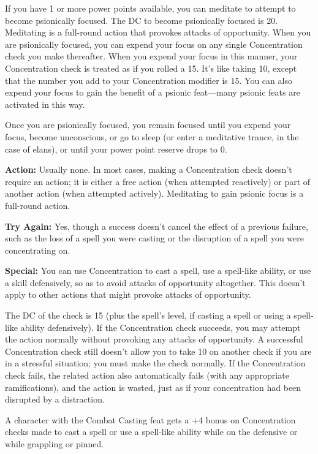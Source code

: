 If you have 1 or more power points available, you can meditate to attempt to become psionically focused. The DC to become psionically focused is 20. Meditating is a full-round action that provokes attacks of opportunity. When you are psionically focused, you can expend your focus on any single Concentration check you make thereafter. When you expend your focus in this manner, your Concentration check is treated as if you rolled a 15. It's like taking 10, except that the number you add to your Concentration modifier is 15. You can also expend your focus to gain the benefit of a psionic feat---many psionic feats are activated in this way.

Once you are psionically focused, you remain focused until you expend your focus, become unconscious, or go to sleep (or enter a meditative trance, in the case of elans), or until your power point reserve drops to 0.

\textbf{Action:} Usually none. In most cases, making a Concentration check doesn't require an action; it is either a free action (when attempted reactively) or part of another action (when attempted actively). Meditating to gain psionic focus is a full-round action.

\textbf{Try Again:} Yes, though a success doesn't cancel the effect of a previous failure, such as the loss of a spell you were casting or the disruption of a spell you were concentrating on.

\textbf{Special:} You can use Concentration to cast a spell, use a spell-like ability, or use a skill defensively, so as to avoid attacks of opportunity altogether. This doesn't apply to other actions that might provoke attacks of opportunity.

The DC of the check is 15 (plus the spell's level, if casting a spell or using a spell-like ability defensively). If the Concentration check succeeds, you may attempt the action normally without provoking any attacks of opportunity. A successful Concentration check still doesn't allow you to take 10 on another check if you are in a stressful situation; you must make the check normally. If the Concentration check fails, the related action also automatically fails (with any appropriate ramifications), and the action is wasted, just as if your concentration had been disrupted by a distraction.

A character with the Combat Casting feat gets a +4 bonus on Concentration checks made to cast a spell or use a spell-like ability while on the defensive or while grappling or pinned.

